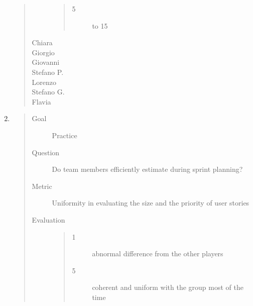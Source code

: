 \documentclass[letterpaper,10pt,italian]{sphinxmanual}
\begin{document}
\begin{enumerate}
\begin{quote}
\begin{description}
\begin{quote}
\begin{description}
\item[{5}] \leavevmode
{} to 15

\end{description}\end{quote}

\item[{Chiara}] \leavevmode
{}

\item[{Giorgio}] \leavevmode
{}

\item[{Giovanni}] \leavevmode
{}

\item[{Stefano P.}] \leavevmode
{}

\item[{Lorenzo}] \leavevmode
{}

\item[{Stefano G.}] \leavevmode
{}

\item[{Flavia}] \leavevmode
{}

\end{description}\end{quote}

\item {} \begin{quote}\begin{description}
\item[{Goal}] \leavevmode
\sphinxAtStartPar
Practice

\item[{Question}] \leavevmode
\sphinxAtStartPar
Do team members efficiently estimate during sprint planning?

\item[{Metric}] \leavevmode
\sphinxAtStartPar
Uniformity in evaluating the size and the priority of user stories

\item[{Evaluation}] \leavevmode\begin{quote}\begin{description}
\item[{1}] \leavevmode
\sphinxAtStartPar
abnormal difference from the other players

\item[{5}] \leavevmode
\sphinxAtStartPar
coherent and uniform with the group most of the time

\end{description}\end{quote}


\end{description}
\end{quote}
\end{enumerate}
\end{document}
